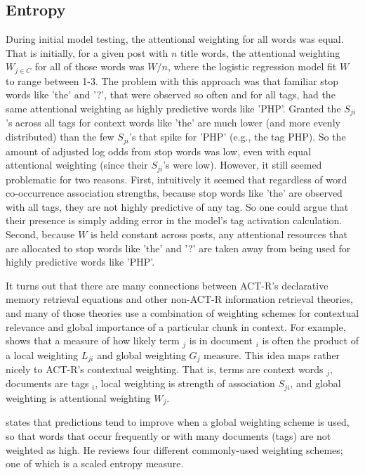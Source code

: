 \documentclass[10pt,letterpaper]{article}
\begin{document}
\subsection{Entropy}

During initial model testing, the attentional weighting for all words was equal.
That is initially, for a given post with $n$ title words, the attentional weighting $W_{j\in C}$ for all of those words was $W/n$, where the logistic regression model fit $W$ to range between 1-3.
The problem with this approach was that familiar stop words like 'the' and '?', that were observed so often and for all tags, had the same attentional weighting as highly predictive words like 'PHP'.
Granted the $S_{ji}$'s across all tags for context words like 'the' are much lower (and more evenly distributed) than the few $S_{ji}$'s that spike for 'PHP' (e.g., the tag PHP).
So the amount of adjusted log odds from stop words was low, even with equal attentional weighting (since their $S_{ji}$'s were low).
However, it still seemed problematic for two reasons.
First, intuitively it seemed that regardless of word co-occurrence association strengths, because stop words like 'the' are observed with all tags, they are not highly predictive of any tag.
So one could argue that their presence is simply adding error in the model's tag activation calculation.
Second, because $W$ is held constant across posts, any attentional resources that are allocated to stop words like 'the' and '?' are taken away from being used for highly predictive words like 'PHP'.

It turns out that there are many connections between ACT-R's declarative memory retrieval equations and other non-ACT-R information retrieval theories,
and many of those theories use a combination of weighting schemes for contextual relevance and global importance of a particular chunk in context.
For example, \cite{Dumais1991} shows that a measure of how likely term ${_j}$ is in document ${_i}$ is often the product of a local weighting $L_{ji}$ and global weighting $G_{j}$ measure.
This idea maps rather nicely to ACT-R's contextual weighting.
That is, terms are context words ${_j}$, documents are tags ${_i}$, local weighting is strength of association $S_{ji}$, and global weighting is attentional weighting $W_{j}$.

\cite{Dumais1991} states that predictions tend to improve when a global weighting scheme is used, so that words that occur frequently or with many documents (tags) are not weighted as high.
He reviews four different commonly-used weighting schemes; one of which is a scaled entropy measure.
\end{document}
